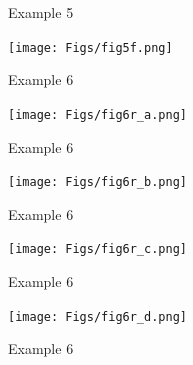 \documentclass[12pt]{article}
\newcommand{\headsize}{\fontsize{35}{35} \selectfont}
\begin{document}
\headsize \color{myyellow}
\hfill \begin{minipage}{5.75in}
\centering
Example 5
\end{minipage}

\vspace{30mm}

\centerline{\texttt{[image: Figs/fig5f.png]}}


\newpage


\headsize \color{myyellow}
\hfill \begin{minipage}{5.75in}
\centering
Example 6
\end{minipage}

\vspace{30mm}

\centerline{\texttt{[image: Figs/fig6r\_a.png]}}




\newpage


\headsize \color{myyellow}
\hfill \begin{minipage}{5.75in}
\centering
Example 6
\end{minipage}

\vspace{30mm}

\centerline{\texttt{[image: Figs/fig6r\_b.png]}}



\newpage


\headsize \color{myyellow}
\hfill \begin{minipage}{5.75in}
\centering
Example 6
\end{minipage}

\vspace{30mm}

\centerline{\texttt{[image: Figs/fig6r\_c.png]}}


\newpage


\headsize \color{myyellow}
\hfill \begin{minipage}{5.75in}
\centering
Example 6
\end{minipage}

\vspace{30mm}

\centerline{\texttt{[image: Figs/fig6r\_d.png]}}


\newpage


\headsize \color{myyellow}
\hfill \begin{minipage}{5.75in}
\centering
Example 6
\end{minipage}

\vspace{30mm}
\end{document}
